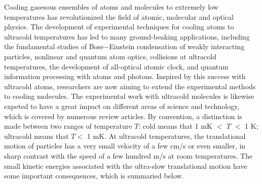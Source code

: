  
Cooling gasesous ensembles of atoms and molecules to extremely low temperatures has revolutionized the 
field of atomic, molecular and optical physics. 
The development of experimental techniques for cooling atoms to ultracold temperatures has led to many ground-beaking applications\cite{southwell2002, chu2002},  
including the fundamental studies of Bose$-$Einstein condensation of weakly interacting particles\cite{anglin2002}, nonlinear and quantum atom 
optics\cite{rolston2002}, collisions at ultracold temperatures\cite{burnett2002}, the development of all-optical atomic
clock\cite{udem2002},
and quantum information processing with atoms and photons\cite{monroe2002}. 
Inspired by this success with 
ultracold atoms, researchers are now aiming to extend the experimental methods to cooling molecules.
The experimental work with ultracold molecules is likewise expeted to have  a great
impact on different areas of science and technology, which is covered by numerous review articles\cite{our-njp-review, friedrich2009, schnell2009, Bell2009, krems2010cold, Ni2009,
Jin2011, Jin2012, quemener2012, Baranov2012}. 
By convention, a distinction is made between two ranges of 
temperature $T$: cold means that 1 mK $<$ $T$ $<$ 1 K; ultracold means that $T < $ 1 mK.   
At ultracold temperatures, the translational motion of particles has a very small velocity of a few cm/s or even smaller, in 
sharp contrast with the speed of a few hundred m/s at room temperatures. 
The small kinetic energies associated with the ultra-slow translational motion have some important consequences, which is summaried below.

